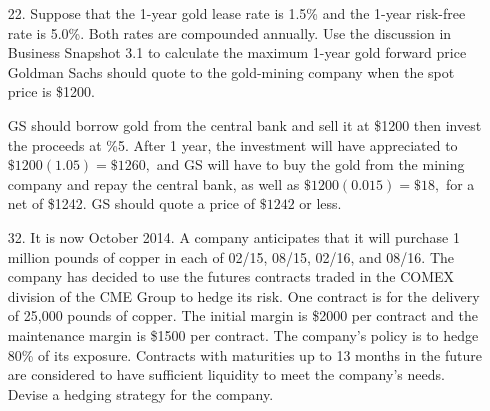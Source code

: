 \documentclass{article}
\begin{document}
\begin{itemize}
	\item[22.] Suppose that the 1-year gold lease rate is 1.5\% and the 1-year risk-free rate is 5.0\%. Both rates are compounded annually. Use the discussion in Business Snapshot 3.1 to calculate the maximum 1-year gold forward price Goldman Sachs should quote to the gold-mining company when the spot price is \$1200.
		\begin{soln}
			GS should borrow gold from the central bank and sell it at \$1200 then invest the proceeds at \%5. After 1 year, the investment will have appreciated to $\$1200(1.05)=\$1260,$ and GS will have to buy the gold from the mining company and repay the central bank, as well as $\$1200(0.015)=\$18,$ for a net of \$1242. GS should quote a price of $\$1242$ or less.
		\end{soln}

		\newpage
	\item[32.] It is now October 2014. A company anticipates that it will purchase 1 million pounds of copper in each of 02/15, 08/15, 02/16, and 08/16. The company has decided to use the futures contracts traded in the COMEX division of the CME Group to hedge its risk. One contract is for the delivery of 25,000 pounds of copper. The initial margin is \$2000 per contract and the maintenance margin is \$1500 per contract. The company's policy is to hedge 80\% of its exposure. Contracts with maturities up to 13 months in the future are considered to have sufficient liquidity to meet the company's needs. Devise a hedging strategy for the company. 


\end{itemize}
\end{document}

